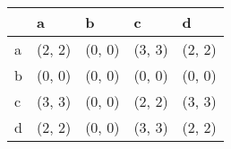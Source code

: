 \begin{tabular}{lllll}
\toprule
{} &       a &       b &       c &       d \\
\midrule
a &  (2, 2) &  (0, 0) &  (3, 3) &  (2, 2) \\
b &  (0, 0) &  (0, 0) &  (0, 0) &  (0, 0) \\
c &  (3, 3) &  (0, 0) &  (2, 2) &  (3, 3) \\
d &  (2, 2) &  (0, 0) &  (3, 3) &  (2, 2) \\
\bottomrule
\end{tabular}
